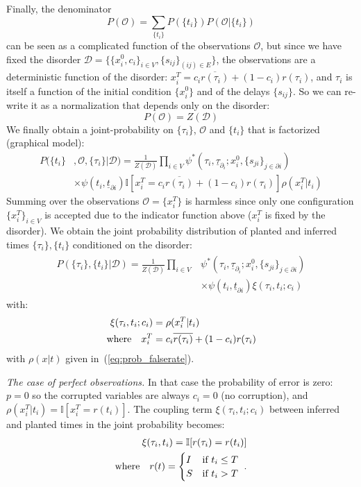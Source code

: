 \documentclass[a4paper, amsfonts, amssymb, amsmath, reprint, showkeys, nofootinbib, twoside, floatfix, pre,superscriptaddress]{revtex4-2}
\begin{document}
Finally, the denominator $$P(\mathcal{O})=\sum_{\{t_i\}}P(\{t_i\})P(\mathcal{O}|\{t_i\})$$ can be seen as a complicated function of the observations $\mathcal{O}$, but since we have fixed the disorder $\mathcal{D}=\{\{x_i^0, c_i\}_{i\in V}, \{s_{ij}\}_{(ij)\in E}\}$, the observations are a deterministic function of the disorder:
$x_i^T=c_i\overline{r(\tau_i)}+(1-c_i)r(\tau_i)$, and $\tau_i$ is itself a function of the initial condition $\{x_i^0\}$ and of the delays $\{s_{ij}\}$. So we can re-write it as a normalization that depends only on the disorder:
$$
	P(\mathcal{O})=Z(\mathcal{D})
$$
We finally obtain a joint-probability on $\{\tau_i\}$, $\mathcal{O}$ and $\{t_i\}$ that is factorized (graphical model):
\begin{align*}
	P(\{t_i\}&,\mathcal{O},\{\tau_i\}|\mathcal{D}) = \frac{1}{Z(\mathcal{D})}\prod_{i\in V}\psi^*(\tau_i, \underline{\tau}_{\partial_i};x_i^0,\{s_{ji}\}_{j\in\partial i}) \\
	&\times \psi(t_i,\underline{t}_{\partial i})\mathbb{I}[x_i^T=c_i\overline{r(\tau_i)}+(1-c_i)r(\tau_i)] \rho(x_i^T|t_i)
\end{align*}
Summing over the observations $\mathcal{O}=\{x_i^T\}$ is harmless since only one configuration $\{x_i^T\}_{i\in V}$ is accepted due to the indicator function above ($x_i^T$ is fixed by the disorder).
We obtain the joint probability distribution of planted and inferred times $\{\tau_i\}, \{t_i\}$ conditioned on the disorder:
\begin{align}
\begin{aligned}
	P(\{\tau_i\}, \{t_i\}|\mathcal{D})=\frac{1}{Z(\mathcal{D})}\prod_{i\in V}&\psi^*(\tau_i, \underline{\tau}_{\partial_i};x_i^0,\{s_{ji}\}_{j\in\partial i}) \\
&\times \psi(t_i,\underline{t}_{\partial i})\xi(\tau_i, t_i;c_i)
\end{aligned}
\end{align}
with:
\begin{align}
\begin{aligned}
	\xi(\tau_i, t_i;c_i) &= \rho(x_i^T|t_i) \\
	{\rm where} \quad x_i^T&=c_i\overline{r(\tau_i)}+(1-c_i)r(\tau_i)
\end{aligned}
\end{align}
with $\rho(x|t)$ given in~(\ref{eq:prob_falserate}).

{\it The case of perfect observations.}
In that case the probability of error is zero: $p=0$ so the corrupted variables are always $c_i=0$ (no corruption), and $\rho(x_i^T|t_i)=\mathbb{I}[x_i^T=r(t_i)]$. The coupling term $\xi(\tau_i, t_i;c_i)$ between inferred and planted times in the joint probability becomes:
\begin{align*}
	\xi(\tau_i, t_i)=\mathbb{I}[r(\tau_i)=r(t_i)] \\
	{\rm where} \quad r(t)=\begin{cases}
	I & \text{if $t_i\leq T$}\\
	S & \text{if $t_i>T$}
	\end{cases} \ .
\end{align*}
\end{document}

